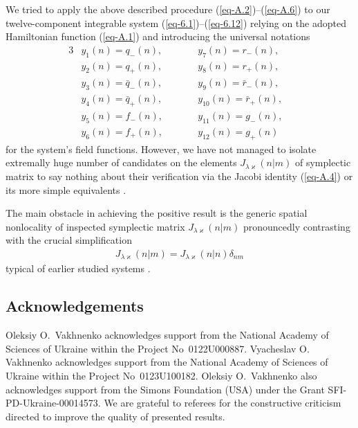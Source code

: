 \documentclass[pdftex]{sigma}
\numberwithin{equation}{section}
\begin{document}
We tried to apply the above described procedure (\ref{eq-A.2})--(\ref{eq-A.6}) to our twelve-component integrable system (\ref{eq-6.1})--(\ref{eq-6.12}) relying on the adopted Hamiltonian function (\ref{eq-A.1}) and introducing the universal notations
\begin{alignat*}{3}%
	&y_{1}(n) = q_{-}(n),\qquad&& y_{7}(n) = r_{-}(n),&
\\ %
	&y_{2}(n) = q_{+}(n),\qquad&& y_{8}(n) = r_{+}(n),&
\\ %
	&y_{3}(n) = \bar{q}_{-}(n),\qquad&& y_{9}(n) = \bar{r}_{-}(n),&
\\ %
	&y_{4}(n) = \bar{q}_{+}(n),\qquad&& y_{10}(n) = \bar{r}_{+}(n),&
\\ %
	&y_{5}(n) = f_{-}(n),\qquad&& y_{11}(n) = g_{-}(n),&
\\ %
	&y_{6}(n) = f_{+}(n),\qquad&& y_{12}(n) = g_{+}(n)&
\end{alignat*}
for the system's field functions. However, we have not managed to isolate extremally huge number of candidates on the elements $J_{\lambda\varkappa}(n|m)$ of symplectic matrix to say nothing about their verification via the Jacobi identity (\ref{eq-A.4}) or its more simple equivalents \cite {maschke-JFI-329-923, torres-del-castillo-RMF-50-608, vakhnenko-JMP-59-053504, vakhnenko-LMP-108-1807}.

The main obstacle in achieving the positive result is the generic spatial nonlocality
of inspected symplectic matrix $J_{\lambda\varkappa}(n|m)$ pronouncedly contrasting with the crucial simplification
 \begin{gather}\label{eq-A.13}
 	J_{\lambda\varkappa}(n|m) = J_{\lambda\varkappa}(n|n)\delta_{nm}
\end{gather}
typical of earlier studied systems \cite{vakhnenko-JMP-56-033505, vakhnenko-JMP-57-113504, vakhnenko-JNMP-24-250, vakhnenko-JMP-59-053504, vakhnenko-LMP-108-1807}.

\subsection*{Acknowledgements}

Oleksiy O.~Vakhnenko acknowledges support from the National Academy of Sciences of Ukraine within the Project No~0122U000887.
Vyacheslav O. Vakhnenko acknowledges support from the National Academy of Sciences of Ukraine within the Project No~0123U100182.
Oleksiy O.~Vakhnenko also acknowledges support from the Simons Foundation (USA) under the Grant SFI-PD-Ukraine-00014573.
We are grateful to referees for the constructive criticism directed to improve the quality of presented results.
\end{document}
